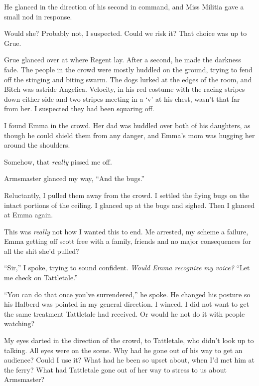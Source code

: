 He glanced in the direction of his second in command, and Miss Militia gave a small nod in response.



Would she?  Probably not, I suspected.  Could we risk it?  That choice was up to Grue.



Grue glanced over at where Regent lay.  After a second, he made the darkness fade.  The people in the crowd were mostly huddled on the ground, trying to fend off the stinging and biting swarm.  The dogs lurked at the edges of the room, and Bitch was astride Angelica.  Velocity, in his red costume with the racing stripes down either side and two stripes meeting in a `v' at his chest, wasn't that far from her.  I suspected they had been squaring off.



I found Emma in the crowd.  Her dad was huddled over both of his daughters, as though he could shield them from any danger, and Emma's mom was hugging her around the shoulders.



Somehow, that \emph{really} pissed me off.



Armsmaster glanced my way, ``And the bugs.''



Reluctantly, I pulled them away from the crowd.  I settled the flying bugs on the intact portions of the ceiling.  I glanced up at the bugs and sighed.  Then I glanced at Emma again.



This was \emph{really }not how I wanted this to end.  Me arrested, my scheme a failure, Emma getting off scott free with a family, friends and no major consequences for all the shit she'd pulled?



``Sir,'' I spoke, trying to sound confident.  \emph{Would Emma recognize my voice?}  ``Let me check on Tattletale.''



``You can do that once you've surrendered,'' he spoke.  He changed his posture so his Halberd was pointed in my general direction.  I winced.  I did not want to get the same treatment Tattletale had received.  Or would he not do it with people watching?



My eyes darted in the direction of the crowd, to Tattletale, who didn't look up to talking.  All eyes were on the scene.  Why had he gone out of his way to get an audience?  Could I use it?  What had he been so upset about, when I'd met him at the ferry?  What had Tattletale gone out of her way to stress to us about Armsmaster?



